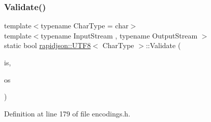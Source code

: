 \subsubsection{\texorpdfstring{Validate()}{Validate()}}
{\footnotesize\ttfamily template$<$typename Char\+Type  = char$>$ \\
template$<$typename Input\+Stream , typename Output\+Stream $>$ \\
static bool \mbox{\hyperlink{structrapidjson_1_1_u_t_f8}{rapidjson\+::\+U\+T\+F8}}$<$ Char\+Type $>$\+::Validate (\begin{DoxyParamCaption}\item[{Input\+Stream \&}]{is,  }\item[{Output\+Stream \&}]{os }\end{DoxyParamCaption})\hspace{0.3cm}{\ttfamily [static]}}



Definition at line 179 of file encodings.\+h.


